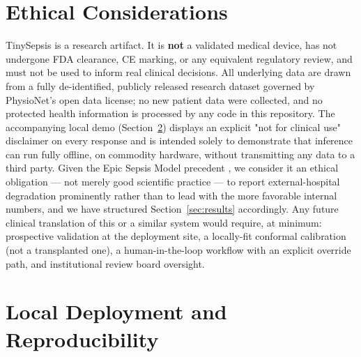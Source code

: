 \documentclass[11pt]{article}
\begin{document}
\section{Ethical Considerations}
\label{sec:ethics}

TinySepsis is a research artifact. It is \textbf{not} a validated medical device, has not undergone FDA clearance, CE marking, or any equivalent regulatory review, and must not be used to inform real clinical decisions. All underlying data are drawn from a fully de-identified, publicly released research dataset governed by PhysioNet's open data license; no new patient data were collected, and no protected health information is processed by any code in this repository. The accompanying local demo (Section~\ref{sec:deployment}) displays an explicit "not for clinical use" disclaimer on every response and is intended solely to demonstrate that inference can run fully offline, on commodity hardware, without transmitting any data to a third party. Given the Epic Sepsis Model precedent \citep{wong2021external, habib2021epic}, we consider it an ethical obligation --- not merely good scientific practice --- to report external-hospital degradation prominently rather than to lead with the more favorable internal numbers, and we have structured Section~\ref{sec:results} accordingly. Any future clinical translation of this or a similar system would require, at minimum: prospective validation at the deployment site, a locally-fit conformal calibration (not a transplanted one), a human-in-the-loop workflow with an explicit override path, and institutional review board oversight.

\section{Local Deployment and Reproducibility}
\label{sec:deployment}
\end{document}
